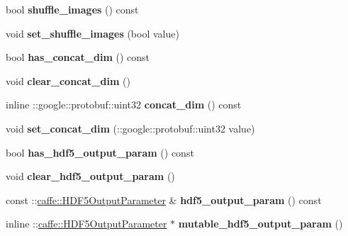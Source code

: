 \begin{DoxyCompactItemize}
bool {\bfseries shuffle\+\_\+images} () const
\item 
\mbox{\label{classcaffe_1_1_v0_layer_parameter_a6c160031576172c180a1333a550eba0b}} 
void {\bfseries set\+\_\+shuffle\+\_\+images} (bool value)
\item 
\mbox{\label{classcaffe_1_1_v0_layer_parameter_ac6a4aa7e482183d1f981b3fd1aef03ce}} 
bool {\bfseries has\+\_\+concat\+\_\+dim} () const
\item 
\mbox{\label{classcaffe_1_1_v0_layer_parameter_a52aa288ab795afa3adff5c808311fad7}} 
void {\bfseries clear\+\_\+concat\+\_\+dim} ()
\item 
\mbox{\label{classcaffe_1_1_v0_layer_parameter_aee1c77807f00bc546933f74f5dac1201}} 
inline \+::google\+::protobuf\+::uint32 {\bfseries concat\+\_\+dim} () const
\item 
\mbox{\label{classcaffe_1_1_v0_layer_parameter_a85828899272448abc8181d11dc82a885}} 
void {\bfseries set\+\_\+concat\+\_\+dim} (\+::google\+::protobuf\+::uint32 value)
\item 
\mbox{\label{classcaffe_1_1_v0_layer_parameter_a4e4ba028875a343f0eddf42509fccf7c}} 
bool {\bfseries has\+\_\+hdf5\+\_\+output\+\_\+param} () const
\item 
\mbox{\label{classcaffe_1_1_v0_layer_parameter_a6edf64869929364b29c905fdf57728cd}} 
void {\bfseries clear\+\_\+hdf5\+\_\+output\+\_\+param} ()
\item 
\mbox{\label{classcaffe_1_1_v0_layer_parameter_abfa3f2cde5ad6c97be898a2093bf1c71}} 
const \+::\mbox{\hyperlink{classcaffe_1_1_h_d_f5_output_parameter}{caffe\+::\+H\+D\+F5\+Output\+Parameter}} \& {\bfseries hdf5\+\_\+output\+\_\+param} () const
\item 
\mbox{\label{classcaffe_1_1_v0_layer_parameter_afed47ffccbabd37aae11589a39f5a6a8}} 
inline \+::\mbox{\hyperlink{classcaffe_1_1_h_d_f5_output_parameter}{caffe\+::\+H\+D\+F5\+Output\+Parameter}} $\ast$ {\bfseries mutable\+\_\+hdf5\+\_\+output\+\_\+param} ()

\end{DoxyCompactItemize}

